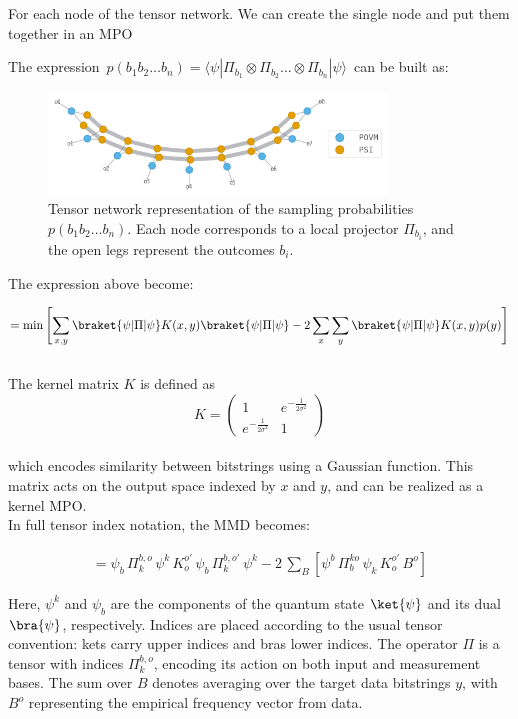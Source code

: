 For each node of the tensor network. We can create the single node and put them together in an MPO

The expression $ \, p(b_1b_2\ldots b_n) = \langle\psi|\Pi_{b_1} \otimes \Pi_{b_2} \ldots \otimes \Pi_{b_n}|\psi\rangle \,$
can be built as:
\begin{figure}[h]
    \centering
    \includegraphics[width=0.8\textwidth]{images/new/probs_tn.png}
    \caption{Tensor network representation of the sampling probabilities $p(b_1b_2\ldots b_n)$. Each node corresponds to a local projector $\Pi_{b_i}$, and the open legs represent the outcomes $b_i$.}
    \label{fig:probs_tn}
\end{figure}

The expression above become:

$$
= \min \left[
\sum_{x, y} \braket{\psi | \Pi | \psi} K(x, y) \braket{\psi | \Pi | \psi}
- 2 \sum_{x} \sum_{y} \braket{\psi | \Pi | \psi} K(x, y) p(y)
\right]
$$
\\
The kernel matrix $ K $ is defined as
$$
K = 
\begin{pmatrix}
1 & e^{-\frac{1}{2\sigma^2}} \\
e^{-\frac{1}{2\sigma^2}} & 1
\end{pmatrix}
$$\\
which encodes similarity between bitstrings using a Gaussian function. This matrix acts on the output space indexed by $ x $ and $ y $, and can be realized as a kernel MPO.\\
In full tensor index notation, the MMD becomes:

$$
\begin{aligned}
= \psi_b \, \Pi_k^{b, o} \, \psi^k \, K_{o}^{o'} \, \psi_b \, \Pi_k^{b, o'} \, \psi^k 
- 2\,\sum_B \left[ 
\psi^b \, \Pi_b^{ko} \, \psi_k \, K_{o}^{o'} \, B^o
\right]
\end{aligned}
$$

Here, $ \psi^k $ and $ \psi_b $ are the components of the quantum state $ \ket{\psi} $ and its dual $ \bra{\psi} $, respectively. Indices are placed according to the usual tensor convention: kets carry upper indices and bras lower indices. The operator $ \Pi $ is a tensor with indices $ \Pi_k^{b, o} $, encoding its action on both input and measurement bases. The sum over $ B $ denotes averaging over the target data bitstrings $ y $, with $ B^o $ representing the empirical frequency vector from data.

